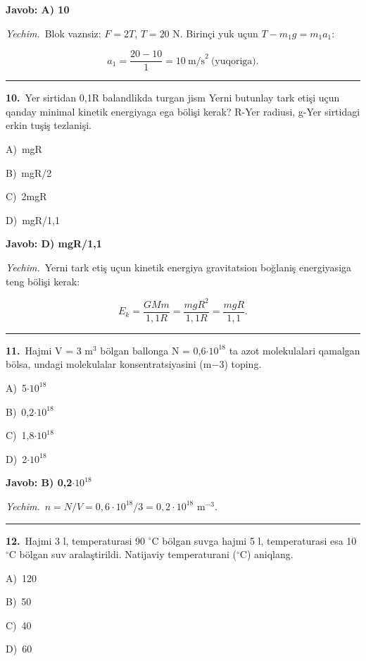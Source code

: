 \documentclass[11pt,a4paper]{article}
\newcommand{\opt}[2]{\hspace*{4mm}#1)\ #2\par}
\begin{document}
\noindent\colorbox{gray!12}{\parbox{\dimexpr\linewidth-2\fboxsep}{\textbf{Javob: A) 10}}}\par\smallskip
\noindent\textit{Yechim.}\ Blok vaznsiz: $F=2T$, $T=20$ N. Birinçi yuk uçun $T-m_1g=m_1a_1$:\par
\[a_1=\frac{20-10}{1}=10\ \text{m/s}^2\ \text{(yuqoriga)}.\]\par\medskip\hrule\medskip
{}\noindent\begin{minipage}{\linewidth}
\textbf{10.}\ Yer sirtidan 0,1R balandlikda turgan jism Yerni butunlay tark etişi uçun qanday minimal kinetik energiyaga ega bölişi kerak? R-Yer radiusi, g-Yer sirtidagi erkin tuşiş tezlanişi.\par\smallskip
\opt{A}{mgR}
\opt{B}{mgR/2}
\opt{C}{2mgR}
\opt{D}{mgR/1,1}
\end{minipage}\vspace{2pt}\par
\noindent\colorbox{gray!12}{\parbox{\dimexpr\linewidth-2\fboxsep}{\textbf{Javob: D) mgR/1,1}}}\par\smallskip
\noindent\textit{Yechim.}\ Yerni tark etiş uçun kinetik energiya gravitatsion boğlaniş energiyasiga teng bölişi kerak:\par
\[E_k=\frac{GMm}{1{,}1R}=\frac{mgR^2}{1{,}1R}=\frac{mgR}{1{,}1}.\]\par\medskip\hrule\medskip
{}\noindent\begin{minipage}{\linewidth}
\textbf{11.}\ Hajmi V = 3 m$^{3}$ bölgan ballonga N = 0,6$\cdot10^{18}$ ta azot molekulalari qamalgan bölsa, undagi molekulalar konsentratsiyasini (m$-$3) toping.\par\smallskip
\opt{A}{5$\cdot10^{18}$}
\opt{B}{0,2$\cdot10^{18}$}
\opt{C}{1,8$\cdot10^{18}$}
\opt{D}{2$\cdot10^{18}$}
\end{minipage}\vspace{2pt}\par
\noindent\colorbox{gray!12}{\parbox{\dimexpr\linewidth-2\fboxsep}{\textbf{Javob: B) 0,2$\cdot10^{18}$}}}\par\smallskip
\noindent\textit{Yechim.}\ $n=N/V=0{,}6\cdot10^{18}/3=0{,}2\cdot10^{18}$ m$^{-3}$.\par\par\medskip\hrule\medskip
{}\noindent\begin{minipage}{\linewidth}
\textbf{12.}\ Hajmi 3 l, temperaturasi 90 $^\circ$C bölgan suvga hajmi 5 l, temperaturasi esa 10 $^\circ$C bölgan suv aralaştirildi. Natijaviy temperaturani ($^\circ$C) aniqlang.\par\smallskip
\opt{A}{120}
\opt{B}{50}
\opt{C}{40}
\opt{D}{60}
\end{minipage}\vspace{2pt}\par
\end{document}
